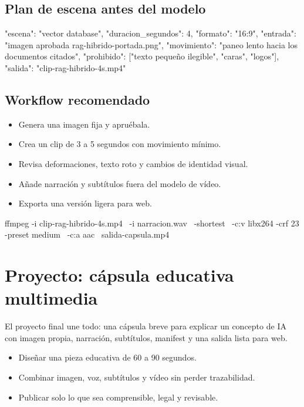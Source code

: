 \documentclass[11pt,a4paper]{book}
\begin{document}
\section{Plan de escena antes del modelo}
\begin{codebox}
{
  "escena": "vector database",
  "duracion_segundos": 4,
  "formato": "16:9",
  "entrada": "imagen aprobada rag-hibrido-portada.png",
  "movimiento": "paneo lento hacia los documentos citados",
  "prohibido": ["texto pequeño ilegible", "caras", "logos"],
  "salida": "clip-rag-hibrido-4s.mp4"
}
\end{codebox}
\section{Workflow recomendado}
\begin{itemize}\item Genera una imagen fija y apruébala.\end{itemize}
\begin{itemize}\item Crea un clip de 3 a 5 segundos con movimiento mínimo.\end{itemize}
\begin{itemize}\item Revisa deformaciones, texto roto y cambios de identidad visual.\end{itemize}
\begin{itemize}\item Añade narración y subtítulos fuera del modelo de vídeo.\end{itemize}
\begin{itemize}\item Exporta una versión ligera para web.\end{itemize}
\begin{codebox}
ffmpeg -i clip-rag-hibrido-4s.mp4 \
  -i narracion.wav \
  -shortest \
  -c:v libx264 -crf 23 -preset medium \
  -c:a aac \
  salida-capsula.mp4
\end{codebox}
\chapter{Proyecto: cápsula educativa multimedia}
El proyecto final une todo: una cápsula breve para explicar un concepto de IA con imagen propia, narración, subtítulos, manifest y una salida lista para web.

\begin{itemize}\item Diseñar una pieza educativa de 60 a 90 segundos.\end{itemize}
\begin{itemize}\item Combinar imagen, voz, subtítulos y vídeo sin perder trazabilidad.\end{itemize}
\begin{itemize}\item Publicar solo lo que sea comprensible, legal y revisable.\end{itemize}
\end{document}
